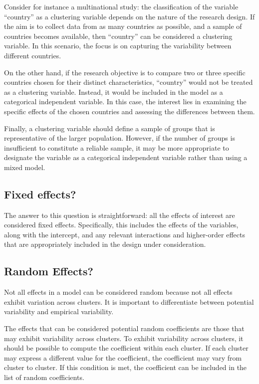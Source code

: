 \documentclass[
]{book}
\begin{document}
Consider for instance a multinational study: the classification of the variable ``country'' as a clustering variable depends on the nature of the research design. If the aim is to collect data from as many countries as possible, and a sample of countries becomes available, then ``country'' can be considered a clustering variable. In this scenario, the focus is on capturing the variability between different countries.

On the other hand, if the research objective is to compare two or three specific countries chosen for their distinct characteristics, ``country'' would not be treated as a clustering variable. Instead, it would be included in the model as a categorical independent variable. In this case, the interest lies in examining the specific effects of the chosen countries and assessing the differences between them.

Finally, a clustering variable should define a sample of groups that is representative of the larger population. However, if the number of groups is insufficient to constitute a reliable sample, it may be more appropriate to designate the variable as a categorical independent variable rather than using a mixed model.

\hypertarget{fixed-effects}{%
\subsection{Fixed effects?}\label{fixed-effects}}

The answer to this question is straightforward: all the effects of interest are considered fixed effects. Specifically, this includes the effects of the variables, along with the intercept, and any relevant interactions and higher-order effects that are appropriately included in the design under consideration.

\hypertarget{random-effects}{%
\subsection{Random Effects?}\label{random-effects}}

Not all effects in a model can be considered random because not all effects exhibit variation across clusters. It is important to differentiate between potential variability and empirical variability.

The effects that can be considered potential random coefficients are those that may exhibit variability across clusters. To exhibit variability across clusters, it should be possible to compute the coefficient within each cluster. If each cluster may express a different value for the coefficient, the coefficient may vary from cluster to cluster. If this condition is met, the coefficient can be included in the list of random coefficients.
\end{document}
